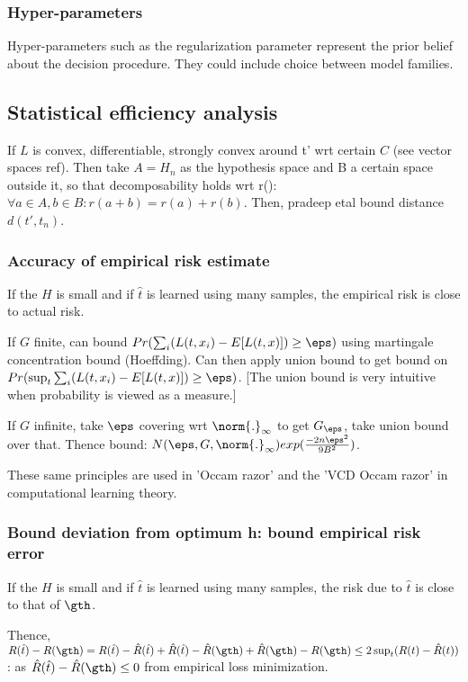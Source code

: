 \documentclass[oneside, article]{memoir}
\begin{document}
\subsubsection{Hyper-parameters}
Hyper-parameters such as the regularization parameter represent the prior belief about the decision procedure. They could include choice between model families.

\subsection{Statistical efficiency analysis}
If $L$ is convex, differentiable, strongly convex around t' wrt certain $C$ (see vector spaces ref). Then take $A = H_n$ as the hypothesis space and B a certain space outside it, so that decomposability holds wrt r(): $\forall a\in A, b\in B: r(a + b) = r(a) + r(b)$. Then, pradeep etal bound distance $d(t', t_n)$.


\subsubsection{Accuracy of empirical risk estimate}
\core  If the $H$ is small and if $\hat{t}$ is learned using many samples, the empirical risk is close to actual risk.

If $G$ finite, can bound $Pr(\sum_i(L(t, x_i) - E[L(t, x)]) \geq \eps)$ using martingale concentration bound (Hoeffding). Can then apply union bound to get bound on $Pr(\sup_t \sum_i(L(t, x_i) - E[L(t, x)]) \geq \eps)$. [The union bound is very intuitive when probability is viewed as a measure.]

If $G$ infinite, take $\eps$ covering wrt $\norm{.}_\infty$ to get $G_\eps$, take union bound over that. Thence bound: $N(\eps, G, \norm{.}_\infty) exp(\frac{-2n\eps^{2}}{9 B^{2}})$.

These same principles are used in 'Occam razor' and the 'VCD Occam razor' in computational learning theory.

\subsubsection{Bound deviation from optimum h: bound empirical risk error}
\core  If the $H$ is small and if $\hat{t}$ is learned using many samples, the risk due to $\hat{t}$ is close to that of $\gth$.

Thence, $R(\hat{t}) - R(\gth)= R(\hat{t}) - \hat{R}(\hat{t}) + \hat{R}(\hat{t}) - \hat{R}(\gth) + \hat{R}(\gth) - R(\gth) \leq 2 \sup_t (R(t) - \hat{R}(t))$: as $\hat{R}(\hat{t}) - \hat{R}(\gth) \leq 0$ from empirical loss minimization.
\end{document}
